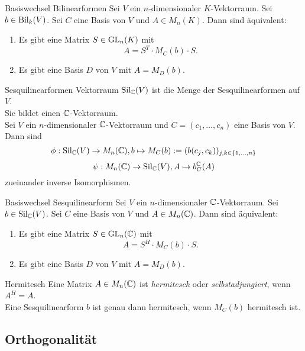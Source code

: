 \documentclass[main.tex]{subfiles}
\begin{document}
\begin{karte}{Basiswechsel Bilinearformen}
    Sei \(V\) ein \(n\)-dimensionaler \(K\)-Vektorraum. 
    Sei \( b\in \operatorname{Bil}_k(V) \). Sei \(C\) eine Basis 
    von \(V\) und \(A\in M_n(K)\). Dann sind 
    äquivalent:
    \begin{enumerate}
        \item Es gibt eine Matrix \(S\in \operatorname{GL}_n(K)\) mit 
        \[ A=S^T \cdot M_C(b) \cdot S. \]
        \item Es gibt eine Basis \( D \) von \(V\) mit
        \(A=M_D(b)\).
    \end{enumerate}
\end{karte}

\begin{karte}{Sesquilinearformen Vektorraum}
    \( \operatorname{Sil}_{\mathbb{C}}(V) \) ist die Menge der 
    Sesquilinearformen auf \( V \). \\
    Sie bildet einen \( \mathbb{C} \)-Vektorraum.\\
    Sei \( V \) ein \(n\)-dimensionaler \(\mathbb{C}\)-Vektorraum 
    und \( C=(c_1, \ldots, c_n) \) eine Basis von \(V\).
    Dann sind  
    \[ \phi : \operatorname{Sil}_{\mathbb{C}}(V) \rightarrow M_n(\mathbb{C}), 
    b\mapsto M_C(b) := (b(c_j, c_k))_{j,k\in\{1,\ldots,n\}} \]
    \[ \psi : M_n(\mathbb{C}) \rightarrow \operatorname{Sil}_{\mathbb{C}}(V), A \mapsto b^{\mathbb{C}}_C(A) \]
    zueinander inverse Isomorphismen.
\end{karte}

\begin{karte}{Basiswechsel Sesquilinearform}
    Sei \(V\) ein \(n\)-dimensionaler \(\mathbb{C}\)-Vektorraum. 
    Sei \(b \in \operatorname{Sil}_{\mathbb{C}}(V)\). Sei \(C\) eine Basis von 
    \(V\) und \(A\in M_n(\mathbb{C})\). Dann sind äquivalent:
    \begin{enumerate}
        \item Es gibt eine Matrix \( S \in \operatorname{GL}_n(\mathbb{C}) \) mit 
        \[ A=S^H \cdot M_C(b) \cdot S. \]
        \item Es gibt eine Basis \(D\) von \( V \) 
        mit \( A=M_D(b) \).
    \end{enumerate}
\end{karte}

\begin{karte}{Hermitesch}
    Eine Matrix \(A\in M_n(\mathbb{C})\) ist \textit{hermitesch} 
    oder \textit{selbstadjungiert}, wenn \(A^H=A\).\\
    Eine Sesquilinearform \( b \) ist genau dann 
    hermitesch, wenn \(M_C(b)\) hermitesch ist.
\end{karte}

\subsection*{Orthogonalität}
\end{document}
